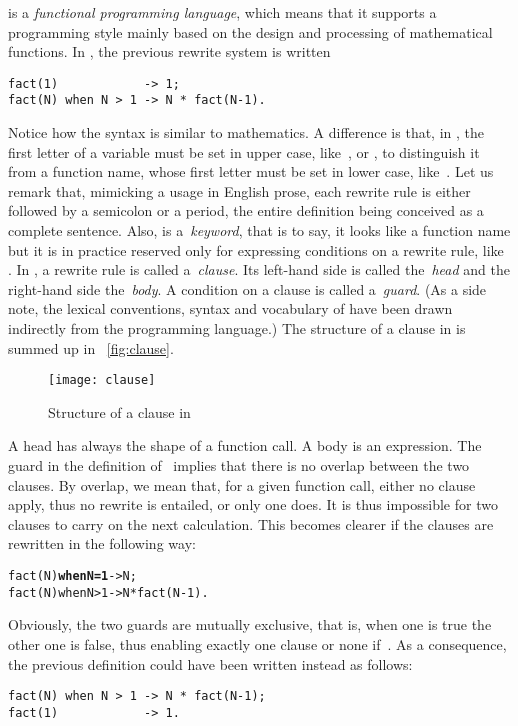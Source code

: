\Erlang is a \emph{functional programming language}, which means that
it supports a programming style mainly based on the design and
processing of mathematical functions. In \Erlang, the previous rewrite
system is written
\begin{verbatim}
fact(1)            -> 1;
fact(N) when N > 1 -> N * fact(N-1).
\end{verbatim}
Notice how the syntax is similar to mathematics. A difference is that,
in \Erlang, the first letter of a variable must be set in upper case,
like~,  or , to distinguish it
from a function name, whose first letter must be set in lower case,
like~. Let us remark that, mimicking a usage in
English prose, each rewrite rule is either followed by a semicolon or
a period, the entire definition being conceived as a complete
sentence. Also,  is a~\emph{keyword}, that is to say, it
looks like a function name but it is in practice reserved only for
expressing conditions on a rewrite rule, like . In
\Erlang, a rewrite rule is called a~\emph{clause}. Its left\hyp{}hand
side is called the~\emph{head} and the right\hyp{}hand side
the~\emph{body}. A condition on a clause is called a~\emph{guard}. (As
a side note, the lexical conventions, syntax and vocabulary of \Erlang
have been drawn indirectly from the \Prolog programming language.)
The structure of a clause in \Erlang is summed up in
\fig~\vref{fig:clause}.
\begin{figure}[t]
\centering
\texttt{[image: clause]}
\caption{Structure of a clause in \Erlang\label{fig:clause}}
\end{figure}
A head has always the shape of a function call. A body is an
expression. The guard in the definition of~ implies that
there is no overlap between the two clauses. By overlap, we mean that,
for a given function call, either no clause apply, thus no rewrite is
entailed, or only one does. It is thus impossible for two clauses to
carry on the next calculation. This becomes clearer if the clauses are
rewritten in the following way:
\begin{alltt}
fact(N) \textbf{when N = 1} -> N;
fact(N) when N > 1 -> N * fact(N-1).
\end{alltt}
Obviously, the two guards are mutually exclusive, that is, when one is
true the other one is false, thus enabling exactly one clause or none
if~. As a consequence, the previous definition could
have been written instead as follows:
\begin{verbatim}
fact(N) when N > 1 -> N * fact(N-1);
fact(1)            -> 1.
\end{verbatim}
